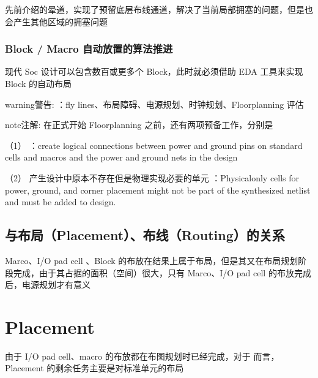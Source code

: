 \documentclass[letterpaper,10pt,english]{sphinxmanual}
\begin{document}
\sphinxAtStartPar
先前介绍的晕道，实现了预留底层布线通道，解决了当前局部拥塞的问题，但是也会产生其他区域的拥塞问题


\subsection{Block / Macro 自动放置的算法推进}
\label{\detokenize{chapter5/Floorplanning_u7684_u8bc4_u4f30:block-macro}}
\sphinxAtStartPar
现代 Soc 设计可以包含数百或更多个 Block，此时就必须借助 EDA 工具来实现 Block 的自动布局

\begin{sphinxadmonition}{warning}{警告:}
\sphinxAtStartPar
{} ：fly lines、布局障碍、电源规划、时钟规划、Floorplanning 评估
\end{sphinxadmonition}

\begin{sphinxadmonition}{note}{注解:}
\sphinxAtStartPar
在正式开始 Floorplanning 之前，还有两项预备工作，分别是

\sphinxAtStartPar
（1）   ：create logical connections between power
and ground pins on standard cells and macros and the power and ground nets in the design

\sphinxAtStartPar
（2） 产生设计中原本不存在但是物理实现必要的单元 ：Physical\sphinxhyphen{}only cells for power, ground, and corner placement might not be part of the
synthesized netlist and must be added to design.
\end{sphinxadmonition}


\section{与布局（Placement）、布线（Routing）的关系}
\label{\detokenize{chapter5/index:placement-routing}}
\sphinxAtStartPar
Marco、I/O pad cell 、Block 的布放在结果上属于布局，但是其又在布局规划阶段完成，由于其占据的面积（空间）很大，只有 Marco、I/O pad cell 的布放完成后，电源规划才有意义


\chapter{Placement}
\label{\detokenize{chapter6/index:placement}}\label{\detokenize{chapter6/index::doc}}
\sphinxAtStartPar
由于 I/O pad cell、macro 的布放都在布图规划时已经完成，对于  而言，Placement 的剩余任务主要是对标准单元的布局
\end{document}
